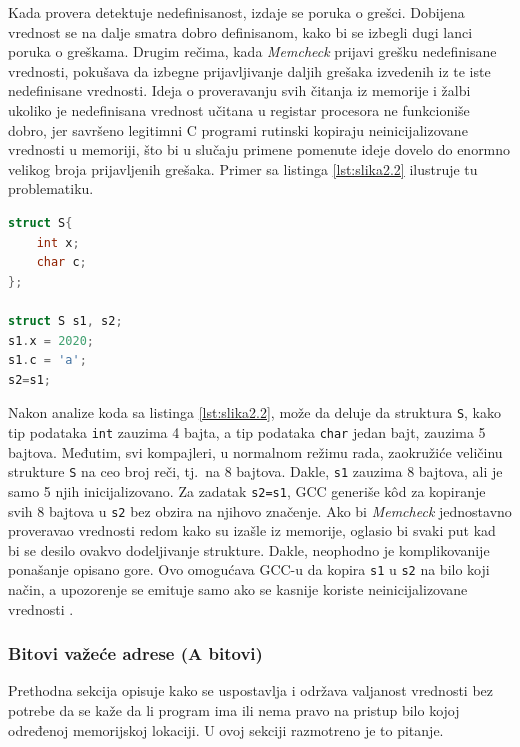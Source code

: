 \documentclass[12pt,oneside]{memoir}
\theoremstyle{plain}
\theoremstyle{definition}
\begin{document}
Kada provera detektuje nedefinisanost, izdaje se poruka o grešci. Dobijena vrednost se na dalje smatra dobro definisanom, kako bi se izbegli dugi lanci poruka o greškama. Drugim rečima, kada \textit{Memcheck} prijavi grešku nedefinisane vrednosti, pokušava da izbegne prijavljivanje daljih grešaka izvedenih iz te iste nedefinisane vrednosti. Ideja o proveravanju svih čitanja iz memorije i žalbi ukoliko je nedefinisana vrednost učitana u registar procesora ne funkcioniše dobro, jer savršeno legitimni C programi rutinski kopiraju neinicijalizovane vrednosti u memoriji, što bi u slučaju primene pomenute ideje dovelo do enormno velikog broja prijavljenih grešaka. Primer sa listinga \ref{lst:slika2.2} ilustruje tu problematiku.

\begin{lstlisting}[style=mystyle,caption={Primer kratkog segmenta koda}, label={lst:slika2.2},language={C}] 
struct S{
	int x;
	char c;
};

struct S s1, s2;
s1.x = 2020;
s1.c = 'a';
s2=s1;
\end{lstlisting}


Nakon analize koda sa listinga \ref{lst:slika2.2}, može da deluje da struktura \texttt{S}, kako tip podataka \texttt{int} zauzima 4 bajta, a tip podataka \texttt{char} jedan bajt, zauzima 5 bajtova. Međutim, svi kompajleri, u normalnom režimu rada, zaokružiće veličinu strukture \texttt{S} na ceo broj reči, tj.~na 8 bajtova. Dakle, \texttt{s1} zauzima 8 bajtova, ali je samo 5 njih inicijalizovano. Za zadatak \texttt{s2=s1}, GCC generiše k\^od za kopiranje svih 8 bajtova u \texttt{s2} bez obzira na njihovo značenje. Ako bi \textit{Memcheck} jednostavno proveravao vrednosti redom kako su izašle iz memorije, oglasio bi svaki put kad bi se desilo ovakvo dodeljivanje strukture. Dakle, neophodno je komplikovanije ponašanje opisano gore. Ovo omogućava GCC-u da kopira \texttt{s1} u \texttt{s2} na bilo koji način, a upozorenje se emituje samo ako se kasnije koriste neinicijalizovane vrednosti \cite{Memcheck}. 

\subsubsection{Bitovi važeće adrese (A bitovi)}
Prethodna sekcija opisuje kako se uspostavlja i održava valjanost vrednosti bez potrebe da se kaže da li program ima ili nema pravo na pristup bilo kojoj određenoj memorijskoj lokaciji. U ovoj sekciji razmotreno je to pitanje.
\end{document}
